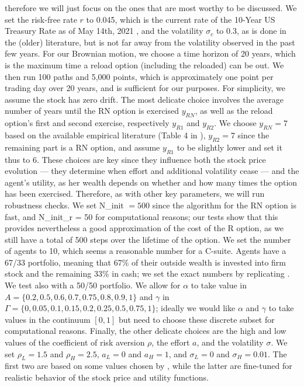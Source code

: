 therefore we will just focus on the ones that are most worthy to be discussed. We set the risk-free rate $r$ to 0.045, which is the current rate of the 10-Year US Treasury Rate as of May 14th, 2021 \cite{ychartrfrate}, and the volatility $\sigma_c$ to 0.3, as is done in the (older) literature, but is not far away from the volatility observed in the past few years. For our Brownian motion, we choose a time horizon of 20 years, which is the maximum time a reload option (including the reloaded) can be out. We then run 100 paths and 5,000 points, which is approximately one point per trading day over 20 years, and is sufficient for our purposes. For simplicity, we assume the stock has zero drift. The most delicate choice involves the average number of years until the RN option is exercised $y_{RN}$, as well as the reload option's first and second exercise, respectively $y_{R1}$ and $y_{R2}$. We choose $y_{RN} = 7$ based on the available empirical literature (Table 4 in \cite{murphy2019employees}), $y_{R2} = 7$ since the remaining part is a RN option, and assume $y_{R1}$ to be slightly lower and set it thus to 6. These choices are key since they influence both the stock price evolution --- they determine when effort and additional volatility cease --- and the agent's utility, as her wealth depends on whether and how many times the option has been exercised. Therefore, as with other key parameters, we will run robustness checks. We set N\_init $= 500$ since the algorithm for the RN option is fast, and N\_init\_r = 50 for computational reasons; our tests show that this provides nevertheless a good approximation of the cost of the R option, as we still have a total of 500 steps over the lifetime of the option. We set the number of agents to 10, which seems a reasonable number for a C-suite. Agents have a 67/33 portfolio, meaning that 67\% of their outside wealth is invested into firm stock and the remaining 33\% in cash; we set the exact numbers by replicating \cite{carpenter1998exercise}. We test also with a 50/50 portfolio. We allow for $\alpha$ to take value in $A = \{0.2, 0.5, 0.6, 0.7, 0.75, 0.8, 0.9, 1\}$ and $\gamma$ in $\Gamma = \{0, 0.05, 0.1, 0.15, 0.2, 0.25, 0.5, 0.75, 1\}$; ideally we would like $\alpha$ and $\gamma$ to take values in the continuum $[0, 1]$ but need to choose these discrete subset for computational reasons. Finally, the other delicate choices are the high and low values of the coefficient of risk aversion $\rho$, the effort $a$, and the volatility $\sigma$. We set $\rho_L = 1.5$ and $\rho_H = 2.5$, $a_L = 0$ and $a_H = 1$, and $\sigma_L = 0$ and $\sigma_H = 0.01$. The first two are based on some values chosen by \cite{carpenter1998exercise}, while the latter are fine-tuned for realistic behavior of the stock price and utility functions. 

